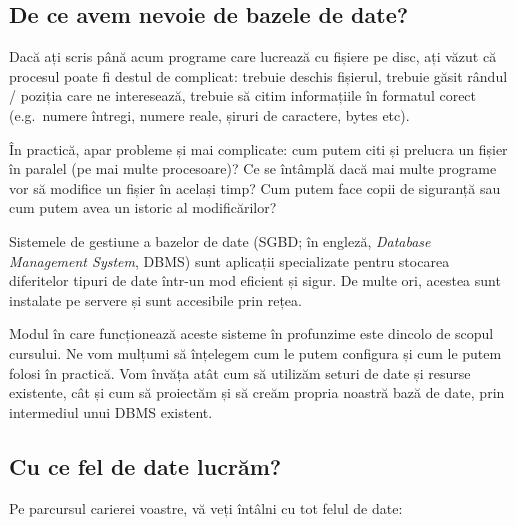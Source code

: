 \documentclass[a4paper, 12pt]{article}
\begin{document}
\subsection*{De ce avem nevoie de bazele de date?}

Dacă ați scris până acum programe care lucrează cu fișiere pe disc, ați văzut că procesul poate fi destul de complicat: trebuie deschis fișierul, trebuie găsit rândul / poziția care ne interesează, trebuie să citim informațiile în formatul corect (e.g.~numere întregi, numere reale, șiruri de caractere, bytes etc).

În practică, apar probleme și mai complicate: cum putem citi și prelucra un fișier în paralel (pe mai multe procesoare)? Ce se întâmplă dacă mai multe programe vor să modifice un fișier în același timp? Cum putem face copii de siguranță sau cum putem avea un istoric al modificărilor?

Sistemele de gestiune a bazelor de date (SGBD; în engleză, \textit{Database Management System}, DBMS) sunt aplicații specializate pentru stocarea diferitelor tipuri de date într-un mod eficient și sigur. De multe ori, acestea sunt instalate pe servere și sunt accesibile prin rețea.

Modul în care funcționează aceste sisteme în profunzime este dincolo de scopul cursului. Ne vom mulțumi să înțelegem cum le putem configura și cum le putem folosi în practică. Vom învăța atât cum să utilizăm seturi de date și resurse existente, cât și cum să proiectăm și să creăm propria noastră bază de date, prin intermediul unui DBMS existent.

\subsection*{Cu ce fel de date lucrăm?}

Pe parcursul carierei voastre, vă veți întâlni cu tot felul de date:
\end{document}
